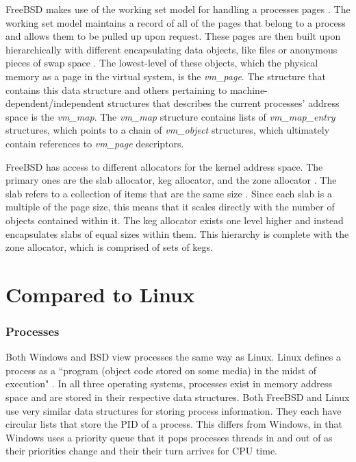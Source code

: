 \documentclass[10pt,draftclsnofoot,onecolumn]{IEEEtran}
\begin{document}
\par FreeBSD makes use of the working set model for handling a processes pages \cite{bsd:1}.
The working set model maintains a record of all of the pages that belong to a process and allows them to be pulled up upon request.
These pages are then built upon hierarchically with different encapsulating data objects, like files or anonymous pieces of swap space \cite{bsd:1}.
The lowest-level of these objects, which the physical memory as a page in the virtual system, is the \textit{vm\_page}.
The structure that contains this data structure and others pertaining to machine-dependent/independent structures that describes the current processes' address space is the \textit{vm\_map}.
The \textit{vm\_map} structure contains lists of \textit{vm\_map\_entry} structures, which points to a chain of \textit{vm\_object} structures, which ultimately contain references to \textit{vm\_page} descriptors.

\par FreeBSD has access to different allocators for the kernel address space.
The primary ones are the slab allocator, keg allocator, and the zone allocator \cite{bsd:1}.
The slab refers to a collection of items that are the same size \cite{bsd:1}.
Since each slab is a multiple of the page size, this means that it scales directly with the number of objects contained within it.
The keg allocator exists one level higher and instead encapsulates slabs of equal sizes within them.
This hierarchy is complete with the zone allocator, which is comprised of sets of kegs.\\

\section{Compared to Linux}

\subsubsection{Processes}
\label{sub:Process Linux}
\par Both Windows and BSD view processes the same way as Linux.
Linux defines a process as a ``program (object code stored on some media) in the midst of execution" \cite{linux:1}.
In all three operating systems, processes exist in memory address space and are stored in their respective data structures.
Both FreeBSD and Linux use very similar data structures for storing process information.
They each have circular lists that store the PID of a process.
This differs from Windows, in that Windows uses a priority queue that it pops processes threads in and out of as their priorities change and their their turn arrives for CPU time.
\end{document}

